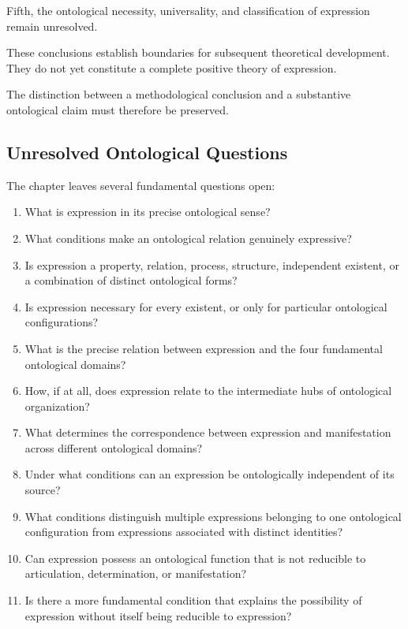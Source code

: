 Fifth, the ontological necessity, universality, and
classification of expression remain unresolved.

These conclusions establish boundaries for subsequent
theoretical development. They do not yet constitute
a complete positive theory of expression.

The distinction between a methodological conclusion
and a substantive ontological claim must therefore
be preserved.

\subsection{Unresolved Ontological Questions}

The chapter leaves several fundamental questions open:

\begin{enumerate}
    \item What is expression in its precise ontological
    sense?

    \item What conditions make an ontological relation
    genuinely expressive?

    \item Is expression a property, relation, process,
    structure, independent existent, or a combination
    of distinct ontological forms?

    \item Is expression necessary for every existent,
    or only for particular ontological configurations?

    \item What is the precise relation between expression
    and the four fundamental ontological domains?

    \item How, if at all, does expression relate to
    the intermediate hubs of ontological organization?

    \item What determines the correspondence between
    expression and manifestation across different
    ontological domains?

    \item Under what conditions can an expression
    be ontologically independent of its source?

    \item What conditions distinguish multiple expressions
    belonging to one ontological configuration from
    expressions associated with distinct identities?

    \item Can expression possess an ontological function
    that is not reducible to articulation, determination,
    or manifestation?

    \item Is there a more fundamental condition that
    explains the possibility of expression without
    itself being reducible to expression?
\end{enumerate}


